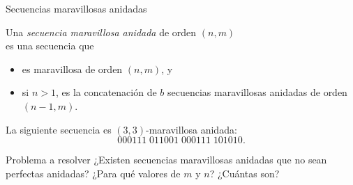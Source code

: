 \documentclass[spanish,xcolor={table}]{beamer}
\begin{document}

\begin{frame}{Secuencias maravillosas anidadas}

\begin{definition}
  Una \emph{secuencia maravillosa anidada} de orden $(n,m)$ \\
  es una secuencia que
  \begin{itemize}
    \item es maravillosa de orden $(n,m)$, y
    \item si $n > 1$, es la concatenación de $b$ secuencias maravillosas anidadas
    de orden $(n-1, m)$.
  \end{itemize}
\end{definition}
\pause

\begin{example}
  La siguiente secuencia es $(3,3)$-maravillosa anidada: \vspace{-.5em}
  \[ 000111\;011001\;000111\;101010. \]
\end{example}
\pause

\begin{alertblock}{Problema a resolver}
  ¿Existen secuencias maravillosas anidadas que no sean perfectas anidadas? 
  ¿Para qué valores de $m$ y $n$? ¿Cuántas son?
\end{alertblock}

\end{frame}

\end{document}
